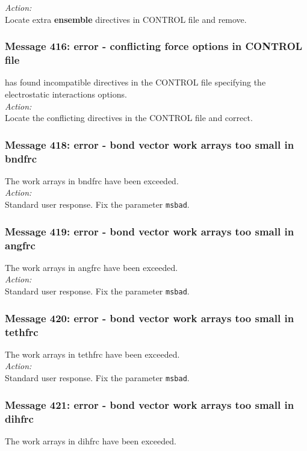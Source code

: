 \noindent
{\em Action:} \\ 
Locate extra {\bf ensemble} directives in CONTROL file and remove.

\subsubsection*{Message 416: error - conflicting force options in
CONTROL file}

\D{} has found incompatible directives in the CONTROL file
specifying the electrostatic interactions options.\\

\noindent
{\em Action:} \\ Locate the conflicting directives in the
CONTROL file and correct.

\subsubsection*{Message 418: error - bond vector work arrays too small
in bndfrc}

The work arrays in {\sc bndfrc} have been exceeded.\\

\noindent
{\em Action:} \\
Standard user response. Fix the parameter {\tt msbad}.


\subsubsection*{Message 419: error - bond vector work arrays too small
in angfrc}
The work arrays in {\sc angfrc} have been exceeded.\\

\noindent
{\em Action:} \\
Standard user response. Fix the parameter {\tt msbad}.


\subsubsection*{Message 420: error - bond vector work arrays too small
in tethfrc}
The work arrays in {\sc tethfrc} have been exceeded.\\

\noindent
{\em Action:} \\
Standard user response. Fix the parameter {\tt msbad}.


\subsubsection*{Message 421: error - bond vector work arrays too small
in dihfrc}
The work arrays in {\sc dihfrc} have been exceeded.\\

